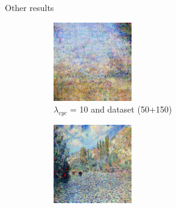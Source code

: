 \documentclass[12pt]{beamer}
\begin{document}
    \begin{frame}{Other results}
        \begin{figure}[H]
            \centering
            \begin{subfigure}[b]{0.3\textwidth}
                \centering
                \includegraphics[width=\textwidth]{resources/cycle-gan/main10.png}
                \caption{$\lambda_{cyc}$ = 10 and dataset (50+150)}
            \end{subfigure}
            \hfill
            \begin{subfigure}[b]{0.3\textwidth}
                \centering
                \includegraphics[width=\textwidth]{resources/cycle-gan/main1.png}

\end{subfigure}
\end{figure}
\end{frame}
\end{document}
